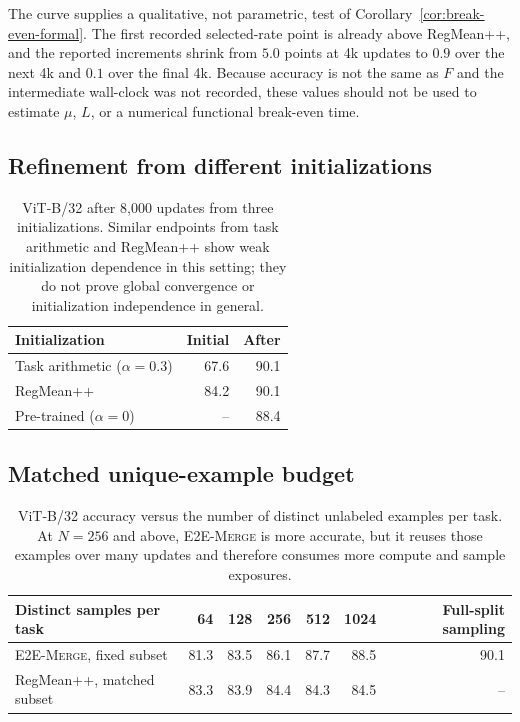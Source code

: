 \documentclass[letterpaper]{article} %
\newcommand{\method}{\textup{\textsc{E2E-Merge}}\xspace}
\theoremstyle{plain}
\theoremstyle{definition}
\begin{document}
The curve supplies a qualitative, not parametric, test of
Corollary~\ref{cor:break-even-formal}. The first recorded selected-rate point is already
above RegMean++, and the reported increments shrink from $5.0$ points at 4k updates to
$0.9$ over the next 4k and $0.1$ over the final 4k. Because accuracy is not the same as
$F$ and the intermediate wall-clock was not recorded, these values should not be used to
estimate $\mu$, $L$, or a numerical functional break-even time.

\subsection{Refinement from different initializations}
\label{app:refiner}

\begin{table}[tb]
\centering
{\small
\begin{tabular*}{\columnwidth}{@{\extracolsep{\fill}}lrr}
\toprule
Initialization & Initial & After \\
\midrule
Task arithmetic ($\alpha=0.3$) & 67.6 & 90.1 \\
RegMean++ & 84.2 & 90.1 \\
Pre-trained ($\alpha=0$) & -- & 88.4 \\
\bottomrule
\end{tabular*}
}
\caption{ViT-B/32 after 8,000 updates from three initializations. Similar endpoints from
task arithmetic and RegMean++ show weak initialization dependence in this setting; they
do not prove global convergence or initialization independence in general.}
\label{tab:refiner}
\end{table}

\subsection{Matched unique-example budget}
\label{app:sample-budget}

\begin{table}[tb]
\centering
{\small
\begin{tabular}{lrrrrrr}
\toprule
Distinct samples per task & 64 & 128 & 256 & 512 & 1024 & Full-split sampling \\
\midrule
\method, fixed subset & 81.3 & 83.5 & 86.1 & 87.7 & 88.5 & 90.1 \\
RegMean++, matched subset & 83.3 & 83.9 & 84.4 & 84.3 & 84.5 & -- \\
\bottomrule
\end{tabular}
}
\caption{ViT-B/32 accuracy versus the number of distinct unlabeled examples per task.
At $N=256$ and above, \method is more accurate, but it reuses those examples over many
updates and therefore consumes more compute and sample exposures.}
\label{tab:sample-budget}
\end{table}
\end{document}
